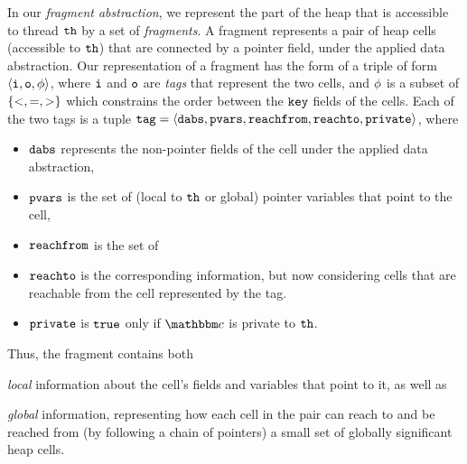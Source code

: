 In our {\em fragment abstraction}, we represent the part of the heap
that is accessible to thread ${\tt th}$ by a set of {\em fragments}. 
A fragment represents a pair of heap cells (accessible to ${\tt th}$)
that are connected by a pointer field, under the applied data abstraction.
Our representation of a fragment has the form of a  triple of form
$\left\langle\mathtt{i},\mathtt{o},\phi\right\rangle$,
where $\mathtt{i}$ and $\mathtt{o}$ are {\em tags} that represent the two cells, and $\phi$
is a subset of $\left\{<, =, >\right\}$ which constrains the order between the $\tt key$
fields of the cells. Each of the two tags is a tuple $\mathtt{tag} = \left\langle\mathtt{dabs},\mathtt{pvars},\mathtt{reachfrom},\mathtt{reachto},\mathtt{private}\right\rangle$, where
\begin{itemize}
\item
  $\mathtt{dabs}$ represents the non-pointer fields of the cell under the applied
  data abstraction,
\item
  $\mathtt{pvars}$ is the set of (local to ${\tt th}$ or global) pointer variables that
  point to the cell,
 \item
  $\mathtt{reachfrom}$ is the set of
\item
  $\mathtt{reachto}$ is the corresponding information, but now considering cells that
  are reachable from the cell represented by the tag.
  \item $\mathtt{private}$ is ${\tt true}$ only if $\cell$ is private to ${\tt th}$.
\end{itemize}
Thus, the fragment contains both
\begin{inparaenum}[(i)]
\item {\em local} information about the cell's fields and variables that
  point to it, as well as
\item {\em global} information, representing how
  each cell in the pair can reach to and be reached from
  (by following a chain of pointers) a small set of globally significant
  heap cells.
\end{inparaenum}

